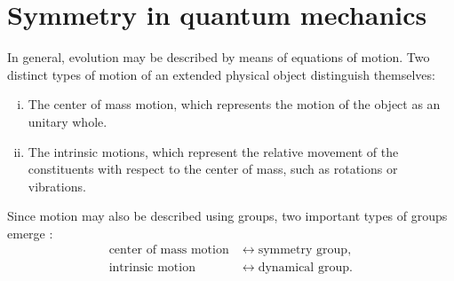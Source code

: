 \documentclass[12pt,a4paper]{report}
\theoremstyle{definition}
\theoremstyle{remark}
\theoremstyle{remark}
\begin{document}
\section{Symmetry in quantum mechanics}
In general, evolution may be described by means of equations of motion. Two distinct types of motion of an extended physical object distinguish themselves:
\begin{enumerate}[i.]
\item The center of mass motion, which represents the motion of the object as an unitary whole.
\item The intrinsic motions, which represent the relative movement of the constituents with respect to the center of mass, such as rotations or vibrations.
\end{enumerate}

Since motion may also be described using groups, two important types of groups emerge \cite{bohmdodonov}:
\begin{equation*}
\begin{aligned}
\text{center of mass motion}&\leftrightarrow\text{symmetry group},\\
\text{intrinsic motion}&\leftrightarrow\text{dynamical group}.
\end{aligned}
\end{equation*}
\end{document}

